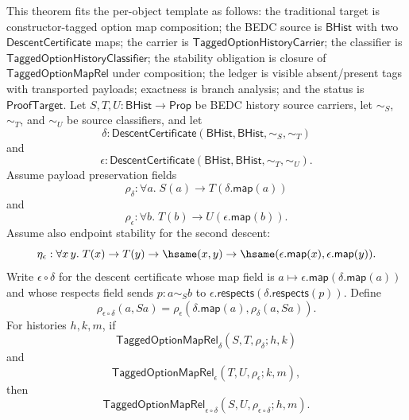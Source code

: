 \begin{theorem}
\label{thm:tagged-option-payload-descent-composition}
This theorem fits the per-object template as follows: the traditional target is
constructor-tagged option map composition; the BEDC source is $\mathsf{BHist}$
with two $\mathsf{DescentCertificate}$ maps; the carrier is
$\mathsf{TaggedOptionHistoryCarrier}$; the classifier is
$\mathsf{TaggedOptionHistoryClassifier}$; the stability obligation is closure of
$\mathsf{TaggedOptionMapRel}$ under composition; the ledger is visible
absent/present tags with transported payloads; exactness is branch analysis; and
the status is $\mathsf{ProofTarget}$. Let $S,T,U:\mathsf{BHist}\to\mathsf{Prop}$
be BEDC history source carriers, let $\sim_S$, $\sim_T$, and $\sim_U$ be source
classifiers, and let
$$
\delta:\mathsf{DescentCertificate}(\mathsf{BHist},\mathsf{BHist},\sim_S,\sim_T)
$$
and
$$
\epsilon:\mathsf{DescentCertificate}(\mathsf{BHist},\mathsf{BHist},\sim_T,\sim_U).
$$
Assume payload preservation fields
$$
\rho_{\delta}:\forall a.\;S(a)\to T(\delta.\mathsf{map}(a))
$$
and
$$
\rho_{\epsilon}:\forall b.\;T(b)\to U(\epsilon.\mathsf{map}(b)).
$$
Assume also endpoint stability for the second descent:
$$
\eta_{\epsilon}:\forall x\,y.\;
T(x)\to T(y)\to \hsame(x,y)\to
\hsame(\epsilon.\mathsf{map}(x),\epsilon.\mathsf{map}(y)).
$$
Write $\epsilon\circ\delta$ for the descent certificate whose map field is
$a\mapsto\epsilon.\mathsf{map}(\delta.\mathsf{map}(a))$ and whose respects field
sends $p:a\sim_S b$ to
$\epsilon.\mathsf{respects}(\delta.\mathsf{respects}(p))$. Define
$$
\rho_{\epsilon\circ\delta}(a,Sa)=
\rho_{\epsilon}(\delta.\mathsf{map}(a),\rho_{\delta}(a,Sa)).
$$
For histories $h,k,m$, if
$$
\mathsf{TaggedOptionMapRel}_{\delta}(S,T,\rho_{\delta};h,k)
$$
and
$$
\mathsf{TaggedOptionMapRel}_{\epsilon}(T,U,\rho_{\epsilon};k,m),
$$
then
$$
\mathsf{TaggedOptionMapRel}_{\epsilon\circ\delta}
(S,U,\rho_{\epsilon\circ\delta};h,m).
$$
\end{theorem}
